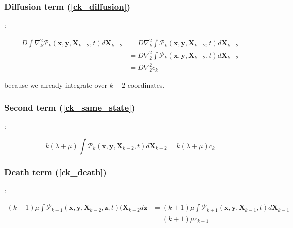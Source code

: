\subsubsection*{Diffusion term (\ref{ck_diffusion})}

:

\begin{subequations} 
\begin{align}
D\int\nabla_{k}^{2}\mathcal{P}_{k}(\boldsymbol{x},\boldsymbol{y},\boldsymbol{X}_{k-2},t)d\boldsymbol{X}_{k-2} & =D\nabla_{k}^{2}\int\mathcal{P}_{k}(\boldsymbol{x},\boldsymbol{y},\boldsymbol{X}_{k-2},t)d\boldsymbol{X}_{k-2}\\
 & =D\nabla_{2}^{2}\int\mathcal{P}_{k}(\boldsymbol{x},\boldsymbol{y},\boldsymbol{X}_{k-2},t)d\boldsymbol{X}_{k-2}\\
 & =D\nabla_{2}^{2}c_{k}\label{diffusion_term_deriv}
\end{align}
\end{subequations}

because we already integrate over $k-2$ coordinates.

\subsubsection*{Second term (\ref{ck_same_state})}

:

\begin{equation}
k(\lambda+\mu)\int\mathcal{P}_{k}(\boldsymbol{x},\boldsymbol{y},\boldsymbol{X}_{k-2},t)d\boldsymbol{X}_{k-2}=k(\lambda+\mu)c_{k}\label{2nd_term_deriv}
\end{equation}


\subsubsection*{Death term (\ref{ck_death})}

:

\begin{subequations} 
\begin{align}
(k+1)\mu\int\mathcal{P}_{k+1}(\boldsymbol{x},\boldsymbol{y},\boldsymbol{X}_{k-2},\boldsymbol{z},t)(\boldsymbol{X}_{k-2}d\boldsymbol{z} & =(k+1)\mu\int\mathcal{P}_{k+1}(\boldsymbol{x},\boldsymbol{y},\boldsymbol{X}_{k-1},t)d\boldsymbol{X}_{k-1}\label{ck_death_1}\\
 & =(k+1)\mu c_{k+1}\label{death_term_deriv}
\end{align}
\end{subequations}

